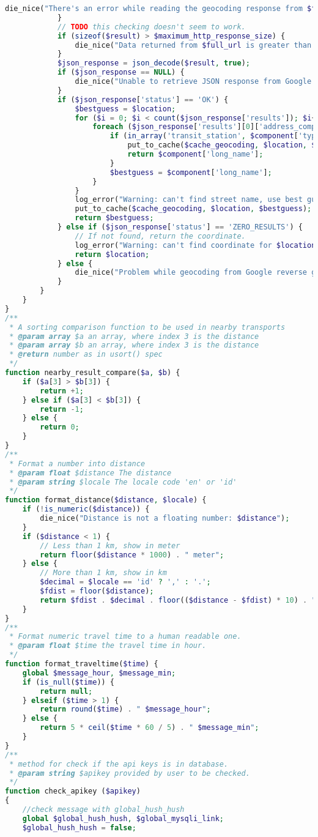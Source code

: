 \begin{lstlisting}[language=PHP,basicstyle=\tiny,caption=handle.php,label={lst:handle.php}]
				die_nice("There's an error while reading the geocoding response from $full_url.");
			}
			// TODO this checking doesn't seem to work.
			if (sizeof($result) > $maximum_http_response_size) {
				die_nice("Data returned from $full_url is greater than the maximum.");
			}
			$json_response = json_decode($result, true);
			if ($json_response == NULL) {
				die_nice("Unable to retrieve JSON response from Google geocoding service.");
			}
			if ($json_response['status'] == 'OK') {
				$bestguess = $location;
				for ($i = 0; $i < count($json_response['results']); $i++) {
					foreach ($json_response['results'][0]['address_components'] as $component) {
						if (in_array('transit_station', $component['types']) || in_array('route', $component['types'])) {
							put_to_cache($cache_geocoding, $location, $component['long_name']);
							return $component['long_name'];
						}
						$bestguess = $component['long_name'];
					}
				}
				log_error("Warning: can't find street name, use best guess $bestguess for $location.");
				put_to_cache($cache_geocoding, $location, $bestguess);
				return $bestguess;
			} else if ($json_response['status'] == 'ZERO_RESULTS') {
				// If not found, return the coordinate.
				log_error("Warning: can't find coordinate for $location.");
				return $location;
			} else {
				die_nice("Problem while geocoding from Google reverse geocoding: " . $result);
			}
		}
	}
}
/**
 * A sorting comparison function to be used in nearby transports
 * @param array $a an array, where index 3 is the distance
 * @param array $b an array, where index 3 is the distance
 * @return number as in usort() spec
 */
function nearby_result_compare($a, $b) {
	if ($a[3] > $b[3]) {
		return +1;
	} else if ($a[3] < $b[3]) {
		return -1;
	} else {
		return 0;
	}
}
/**
 * Format a number into distance
 * @param float $distance The distance
 * @param string $locale The locale code 'en' or 'id'
 */
function format_distance($distance, $locale) {
	if (!is_numeric($distance)) {
		die_nice("Distance is not a floating number: $distance");
	}
	if ($distance < 1) {
		// Less than 1 km, show in meter
		return floor($distance * 1000) . " meter";
	} else {
		// More than 1 km, show in km
		$decimal = $locale == 'id' ? ',' : '.';
		$fdist = floor($distance);
		return $fdist . $decimal . floor(($distance - $fdist) * 10) . " kilometer";
	}
}
/**
 * Format numeric travel time to a human readable one.
 * @param float $time the travel time in hour.
 */
function format_traveltime($time) {
	global $message_hour, $message_min;
	if (is_null($time)) {
		return null;
	} elseif ($time > 1) {
		return round($time) . " $message_hour";
	} else {
		return 5 * ceil($time * 60 / 5) . " $message_min";
	}
}
/**
 * method for check if the api keys is in database.
 * @param string $apikey provided by user to be checked.
 */
function check_apikey ($apikey)
{
	//check message with global_hush_hush
	global $global_hush_hush, $global_mysqli_link;
	$global_hush_hush = false;
	

\end{lstlisting}
